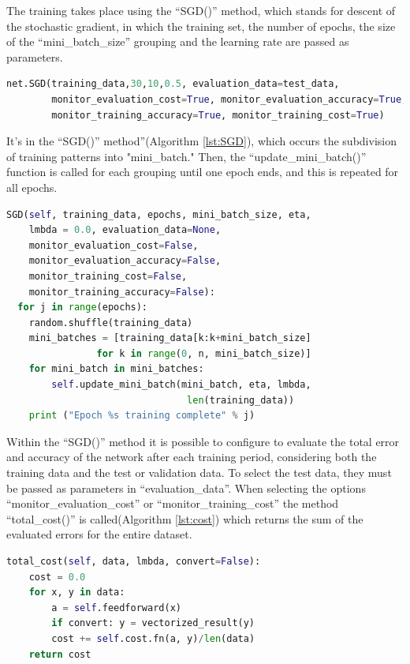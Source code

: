 The training takes place using the “SGD()” method, which stands for descent of the stochastic gradient, in which the training set, the number of epochs, the size of the “mini\_batch\_size” grouping and the learning rate are passed as parameters.

\begin{lstlisting}[caption={SGD call in Python},label={lst:sgd},language=Python]
net.SGD(training_data,30,10,0.5, evaluation_data=test_data,
        monitor_evaluation_cost=True, monitor_evaluation_accuracy=True,
        monitor_training_accuracy=True, monitor_training_cost=True)
\end{lstlisting}

It's in the “SGD()” method”(Algorithm \ref{lst:SGD}), which occurs the subdivision of training patterns into "mini\_batch." Then, the “update\_mini\_batch()” function is called for each grouping until one epoch ends, and this is repeated for all epochs.

\begin{lstlisting}[caption={SGD method in Python},label={lst:SGD},language=Python]
SGD(self, training_data, epochs, mini_batch_size, eta,
    lmbda = 0.0, evaluation_data=None, 
    monitor_evaluation_cost=False, 
    monitor_evaluation_accuracy=False,
    monitor_training_cost=False, 
    monitor_training_accuracy=False):
  for j in range(epochs):
    random.shuffle(training_data)
    mini_batches = [training_data[k:k+mini_batch_size] 
                for k in range(0, n, mini_batch_size)]
    for mini_batch in mini_batches:
        self.update_mini_batch(mini_batch, eta, lmbda,
                                len(training_data))
    print ("Epoch %s training complete" % j)
\end{lstlisting}

Within the “SGD()” method it is possible to configure to evaluate the total error and accuracy of the network after each training period, considering both the training data and the test or validation data. To select the test data, they must be passed as parameters in “evaluation\_data”. When selecting the options “monitor\_evaluation\_cost” or “monitor\_training\_cost” the method “total\_cost()” is called(Algorithm \ref{lst:cost}) which returns the sum of the evaluated errors for the entire dataset.

\begin{lstlisting}[caption={total\_cost() method in Python},label={lst:cost},language=Python]
total_cost(self, data, lmbda, convert=False):
    cost = 0.0
    for x, y in data:
        a = self.feedforward(x)
        if convert: y = vectorized_result(y)
        cost += self.cost.fn(a, y)/len(data)
    return cost
\end{lstlisting}

